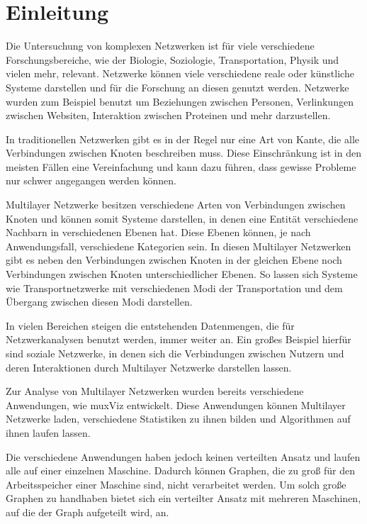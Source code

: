 \chapter{Einleitung}


Die Untersuchung von komplexen Netzwerken ist für viele verschiedene Forschungsbereiche, wie der Biologie, Soziologie, Transportation, Physik und vielen mehr, relevant. 
Netzwerke können viele verschiedene reale oder künstliche Systeme darstellen und für die Forschung an diesen genutzt werden. Netzwerke wurden zum Beispiel benutzt um Beziehungen zwischen Personen, Verlinkungen zwischen Websiten, Interaktion zwischen Proteinen und mehr darzustellen.

In traditionellen Netzwerken gibt es in der Regel nur eine Art von Kante, die alle Verbindungen zwischen Knoten beschreiben muss.
Diese Einschränkung ist in den meisten Fällen eine Vereinfachung und kann dazu führen, dass gewisse Probleme nur schwer angegangen werden können. 

Multilayer Netzwerke besitzen verschiedene Arten von Verbindungen zwischen Knoten und können somit Systeme darstellen, in denen eine Entität verschiedene Nachbarn in verschiedenen Ebenen hat.
Diese Ebenen können, je nach Anwendungsfall, verschiedene Kategorien sein. In diesen Multilayer Netzwerken gibt es neben den Verbindungen zwischen Knoten in der gleichen Ebene noch Verbindungen zwischen Knoten unterschiedlicher Ebenen.
So lassen sich Systeme wie Transportnetzwerke mit verschiedenen Modi der Transportation und dem Übergang zwischen diesen Modi darstellen.

In vielen Bereichen steigen die entstehenden Datenmengen, die für Netzwerkanalysen benutzt werden, immer weiter an. Ein großes Beispiel hierfür sind soziale Netzwerke, in denen sich die Verbindungen zwischen Nutzern und deren Interaktionen durch Multilayer Netzwerke darstellen lassen.


Zur Analyse von Multilayer Netzwerken wurden bereits verschiedene Anwendungen, wie muxViz entwickelt. Diese Anwendungen können Multilayer Netzwerke laden, verschiedene Statistiken zu ihnen bilden und Algorithmen auf ihnen laufen lassen.

Die verschiedene Anwendungen haben jedoch keinen verteilten Ansatz und laufen alle auf einer einzelnen Maschine. Dadurch können Graphen, die zu groß für den Arbeitsspeicher einer Maschine sind, nicht verarbeitet werden. 
Um solch große Graphen zu handhaben bietet sich ein verteilter Ansatz mit mehreren Maschinen, auf die der Graph aufgeteilt wird, an.


